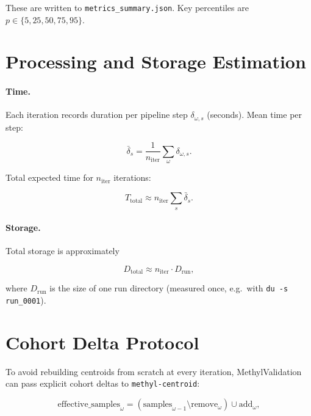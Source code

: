 \documentclass[11pt]{article}
\begin{document}
These are written to \texttt{metrics\_summary.json}.  Key percentiles are
\(p \in \{5, 25, 50, 75, 95\}\).

\section{Processing and Storage Estimation}

\paragraph{Time.}

Each iteration records duration per pipeline step \(\delta_{\omega,s}\)
(seconds).  Mean time per step:

\begin{equation}
  \bar{\delta}_s = \frac{1}{n_\mathrm{iter}} \sum_\omega \delta_{\omega,s}.
\end{equation}

Total expected time for $n_\mathrm{iter}$ iterations:

\begin{equation}
  T_\mathrm{total} \approx n_\mathrm{iter} \sum_s \bar{\delta}_s.
\end{equation}

\paragraph{Storage.}

Total storage is approximately

\begin{equation}
  D_\mathrm{total} \approx n_\mathrm{iter} \cdot D_\mathrm{run},
\end{equation}

where $D_\mathrm{run}$ is the size of one run directory (measured once, e.g.\
with \texttt{du -s run\_0001}).

\section{Cohort Delta Protocol}

To avoid rebuilding centroids from scratch at every iteration,
MethylValidation can pass explicit cohort deltas to \texttt{methyl-centroid}:

\begin{equation}
  \text{effective\_samples}_\omega
  = (\text{samples}_{\omega-1} \setminus \text{remove}_\omega)
    \cup \text{add}_\omega,
\end{equation}
\end{document}
